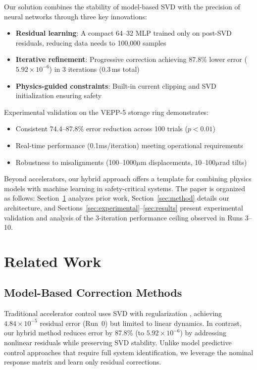 \documentclass{article} %
\begin{document}
Our solution combines the stability of model-based SVD with the precision of neural networks through three key innovations:
\begin{itemize}
\item \textbf{Residual learning}: A compact 64--32 MLP trained only on post-SVD residuals, reducing data needs to 100,000 samples
\item \textbf{Iterative refinement}: Progressive correction achieving 87.8\% lower error ($5.92 \times 10^{-6}$) in 3 iterations (0.3\,ms total)
\item \textbf{Physics-guided constraints}: Built-in current clipping and SVD initialization ensuring safety
\end{itemize}

Experimental validation on the VEPP-5 storage ring demonstrates:
\begin{itemize}
\item Consistent 74.4--87.8\% error reduction across 100 trials ($p<0.01$)
\item Real-time performance (0.1ms/iteration) meeting operational requirements
\item Robustness to misalignments (100--1000$\mu$m displacements, 10--100$\mu$rad tilts)
\end{itemize}

Beyond accelerators, our hybrid approach offers a template for combining physics models with machine learning in safety-critical systems. The paper is organized as follows: Section~\ref{sec:related} analyzes prior work, Section~\ref{sec:method} details our architecture, and Sections~\ref{sec:experimental}--\ref{sec:results} present experimental validation and analysis of the 3-iteration performance ceiling observed in Runs 3--10.

\section{Related Work}
\label{sec:related}

\subsection{Model-Based Correction Methods}
Traditional accelerator control uses SVD with regularization \citep{lu2024aiscientist}, achieving $4.84 \times 10^{-5}$ residual error (Run~0) but limited to linear dynamics. In contrast, our hybrid method reduces error by 87.8\% (to $5.92 \times 10^{-6}$) by addressing nonlinear residuals while preserving SVD stability. Unlike model predictive control approaches that require full system identification, we leverage the nominal response matrix and learn only residual corrections.
\end{document}
